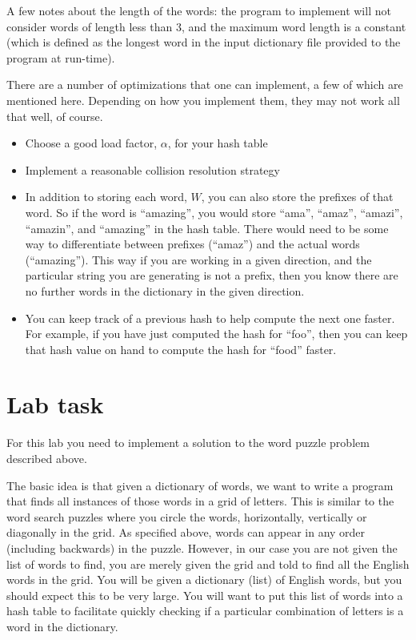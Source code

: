 \documentclass[11pt]{article}
\begin{document}
A few notes about the length of the words: the program to implement will not consider words of length less than 3, and the maximum word length is a constant (which is defined as the longest word in the input dictionary file provided to the program at run-time).

There are a number of optimizations that one can implement, a few of which are mentioned here. Depending on how you implement them, they may not work all that well, of course.
\begin{itemize}
\item    Choose a good load factor, $\alpha$, for your hash table
\item    Implement a reasonable collision resolution strategy
\item    In addition to storing each word, $W$, you can also store the prefixes of that word. So if the word is ``amazing'', you would store ``ama'', ``amaz'', ``amazi'', ``amazin'', and ``amazing'' in the hash table. There would need to be some way to differentiate between prefixes (``amaz'') and the actual words (``amazing''). This way if you are working in a given direction, and the particular string you are generating is not a prefix, then you know there are no further words in the dictionary in the given direction.
\item    You can keep track of a previous hash to help compute the next one faster. For example, if you have just computed the hash for ``foo'', then you can keep that hash value on hand to compute the hash for ``food'' faster.
\end{itemize}

\section*{Lab task}
For this lab you need to implement a solution to the word puzzle problem described above.

The basic idea is that given a dictionary of words, we want to write a program that finds all instances of those words in a grid of letters. This is similar to the word search puzzles where you circle the words, horizontally, vertically or diagonally in the grid. As specified above, words can appear in any order (including backwards) in the puzzle. However, in our case you are not given the list of words to find, you are merely given the grid and told to find all the English words in the grid. You will be given a dictionary (list) of English words, but you should expect this to be very large. You will want to put this list of words into a hash table to facilitate quickly checking if a particular combination of letters is a word in the dictionary.
\end{document}
